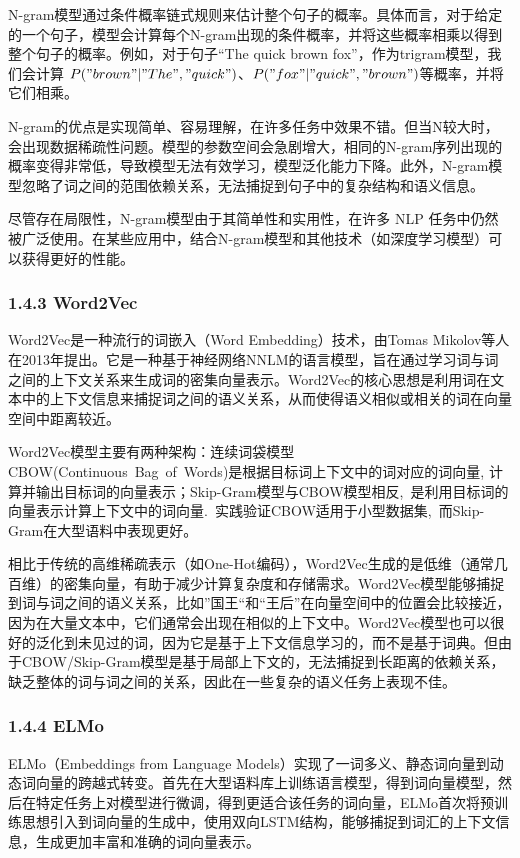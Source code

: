 \documentclass[12pt,a4paper]{book}
\begin{document}
N-gram模型通过条件概率链式规则来估计整个句子的概率。具体而言，对于给定的一个句子，模型会计算每个N-gram出现的条件概率，并将这些概率相乘以得到整个句子的概率。例如，对于句子``The
quick brown fox''，作为trigram模型，我们会计算
\(P("brown" | "The", "quick")\)、\(P("fox" | "quick", "brown")\)等概率，并将它们相乘。

N-gram的优点是实现简单、容易理解，在许多任务中效果不错。但当N较大时，会出现数据稀疏性问题。模型的参数空间会急剧增大，相同的N-gram序列出现的概率变得非常低，导致模型无法有效学习，模型泛化能力下降。此外，N-gram模型忽略了词之间的范围依赖关系，无法捕捉到句子中的复杂结构和语义信息。

尽管存在局限性，N-gram模型由于其简单性和实用性，在许多 NLP
任务中仍然被广泛使用。在某些应用中，结合N-gram模型和其他技术（如深度学习模型）可以获得更好的性能。

\subsubsection{1.4.3 Word2Vec}\label{word2vec}

Word2Vec是一种流行的词嵌入（Word Embedding）技术，由Tomas
Mikolov等人在2013年提出。它是一种基于神经网络NNLM的语言模型，旨在通过学习词与词之间的上下文关系来生成词的密集向量表示。Word2Vec的核心思想是利用词在文本中的上下文信息来捕捉词之间的语义关系，从而使得语义相似或相关的词在向量空间中距离较近。

Word2Vec模型主要有两种架构：连续词袋模型CBOW(Continuous~Bag~of~Words)是根据目标词上下文中的词对应的词向量,
计算并输出目标词的向量表示；Skip-Gram模型与CBOW模型相反,~是利用目标词的向量表示计算上下文中的词向量.~实践验证CBOW适用于小型数据集,~而Skip-Gram在大型语料中表现更好。

相比于传统的高维稀疏表示（如One-Hot编码），Word2Vec生成的是低维（通常几百维）的密集向量，有助于减少计算复杂度和存储需求。Word2Vec模型能够捕捉到词与词之间的语义关系，比如''国王``和``王后''在向量空间中的位置会比较接近，因为在大量文本中，它们通常会出现在相似的上下文中。Word2Vec模型也可以很好的泛化到未见过的词，因为它是基于上下文信息学习的，而不是基于词典。但由于CBOW/Skip-Gram模型是基于局部上下文的，无法捕捉到长距离的依赖关系，缺乏整体的词与词之间的关系，因此在一些复杂的语义任务上表现不佳。

\subsubsection{1.4.4 ELMo}\label{elmo}

ELMo（Embeddings from Language
Models）实现了一词多义、静态词向量到动态词向量的跨越式转变。首先在大型语料库上训练语言模型，得到词向量模型，然后在特定任务上对模型进行微调，得到更适合该任务的词向量，ELMo首次将预训练思想引入到词向量的生成中，使用双向LSTM结构，能够捕捉到词汇的上下文信息，生成更加丰富和准确的词向量表示。
\end{document}
